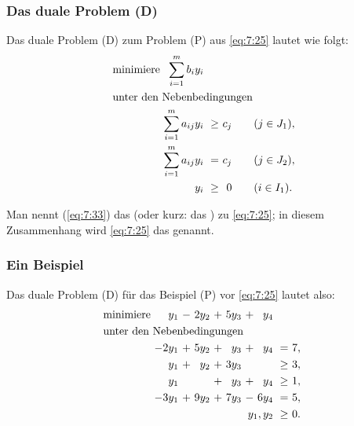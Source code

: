 \documentclass[smaller]{beamer}
\begin{document}
\begin{frame}
 \frametitle{Das duale Problem (D)}
Das duale Problem (D) zum Problem (P) aus \eqref{eq:7:25} lautet wie folgt:
\begin{align}
\begin{alignedat}{4}
\label{eq:7:33}
& \text{minimiere } & \sum\limits_{i=1}^{m}{b_iy_i} & & & \\
& \rlap{unter den Nebenbedingungen} & & & & \\
&& \sum\limits_{i=1}^{m}{a_{ij}y_i} &\ \geq &\ c_j & \qquad (j \in J_1), \\
&& \sum\limits_{i=1}^{m}{a_{ij}y_i} &\    = &\ c_j & \qquad (j \in J_2), \\
&&                              y_i &\ \geq &\   0 & \qquad (i \in I_1).
\end{alignedat}
\end{align}

Man nennt (\ref{eq:7:33}) das  (oder kurz: das ) zu \eqref{eq:7:25}; in diesem Zusammenhang wird \eqref{eq:7:25} das  genannt.
\end{frame}

\begin{frame}
 \frametitle{Ein Beispiel}
  Das duale Problem (D) für das Beispiel (P) vor \eqref{eq:7:25} lautet also:
\begin{align*}
\begin{alignedat}{6}
& \text{minimiere } & y_1 &\ - &\ 2y_2 &\ + &\ 5y_3 &\ + &\ y_4 & & \\
& \rlap{unter den Nebenbedingungen} & & & & & & & & & \\
&& -2y_1 &\ + &\ 5y_2 &\ + &\  y_3 &\ + &\  y_4 &\    = &\ 7,\ \\
&&   y_1 &\ + &\  y_2 &\ + &\ 3y_3 &\   &\      &\ \geq &\ 3,\ \\
&&   y_1 &\   &\      &\ + &\  y_3 &\ + &\  y_4 &\ \geq &\ 1,\ \\
&& -3y_1 &\ + &\ 9y_2 &\ + &\ 7y_3 &\ - &\ 6y_4 &\    = &\ 5,\ \\
&& & & & & & & \llap{$y_1,y_2$} &\ \geq &\ 0.\
\end{alignedat}
\end{align*}
\end{frame}
\end{document}
